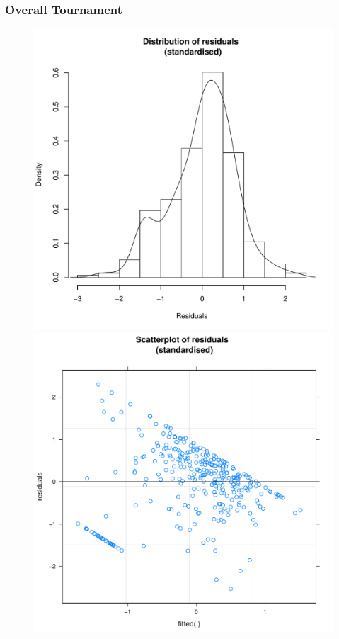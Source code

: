 \begin{CJK}{UTF8}{gbsn}
      \subsubsection{Overall Tournament\label{app8:MLM32a}}




  \begin{figure}[htbp]
   \includegraphics[scale =.4]{images/MLM32aHist.pdf}
        \includegraphics[scale =.4]{images/MLM32aScatter.pdf}

\end{figure}
\end{CJK}
